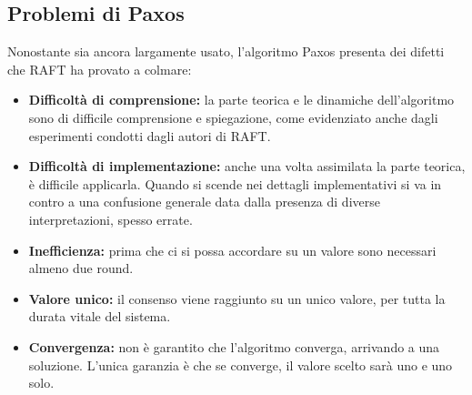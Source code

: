 \subsection{Problemi di Paxos}
  Nonostante sia ancora largamente usato, l'algoritmo Paxos presenta dei difetti che RAFT ha provato a colmare:
  \begin{itemize}
  	\item \textbf{Difficoltà di comprensione:} la parte teorica e le dinamiche dell'algoritmo sono di difficile comprensione e spiegazione, come evidenziato anche dagli esperimenti condotti dagli autori di RAFT.
  	
  	\item \textbf{Difficoltà di implementazione:} anche una volta assimilata la parte teorica, è difficile applicarla. Quando si scende nei dettagli implementativi si va in contro a una confusione generale data dalla presenza di diverse interpretazioni, spesso errate.

  	\item \textbf{Inefficienza:} prima che ci si possa accordare su un valore sono necessari almeno due round.

  	\item \textbf{Valore unico:} il consenso viene raggiunto su un unico valore, per tutta la durata vitale del sistema.

  	\item \textbf{Convergenza:} non è garantito che l'algoritmo converga, arrivando a una soluzione. L'unica garanzia è che se converge, il valore scelto sarà uno e uno solo.
  \end{itemize}